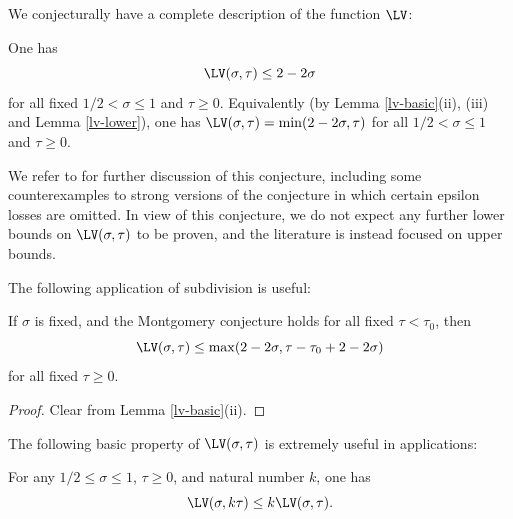 We conjecturally have a complete description of the function $\LV$:

\begin{conjecture}\label{montgomery-conj}  One has
    \begin{equation}\label{mont-conj}
        \LV(\sigma, \tau) \leq 2 - 2 \sigma
    \end{equation}
     for all fixed $1/2 < \sigma \leq 1$ and $\tau \geq 0$. Equivalently (by Lemma \ref{lv-basic}(ii), (iii) and Lemma \ref{lv-lower}), one has $\LV(\sigma, \tau) = \min(2 - 2 \sigma,\tau)$ for all $1/2 < \sigma \leq 1$ and $\tau \geq 0$.
\end{conjecture}


We refer to \cite{bourgain_montgomery_1991} for further discussion of this conjecture, including some counterexamples to strong versions of the conjecture in which certain epsilon losses are omitted.  In view of this conjecture, we do not expect any further lower bounds on $\LV(\sigma,\tau)$ to be proven, and the literature is instead focused on upper bounds.

The following application of subdivision is useful:

\begin{lemma}\label{montgomery-subdivide}  If $\sigma$ is fixed, and the Montgomery conjecture holds for all fixed $\tau < \tau_0$, then
\begin{equation}\label{lvt-opt}
    \LV(\sigma, \tau) \leq \max( 2 - 2 \sigma, \tau - \tau_0 + 2 - 2\sigma)
\end{equation}
for all fixed $\tau \geq 0$.
\end{lemma}

\begin{proof}
Clear from Lemma \ref{lv-basic}(ii).
\end{proof}


The following basic property of $\LV(\sigma,\tau)$ is extremely useful in applications:

\begin{lemma}\label{power-lemma}  For any $1/2 \leq \sigma \leq 1$, $\tau \geq 0$, and natural number $k$, one has
    $$ \LV(\sigma, k\tau) \leq k \LV(\sigma, \tau).$$
\end{lemma}


